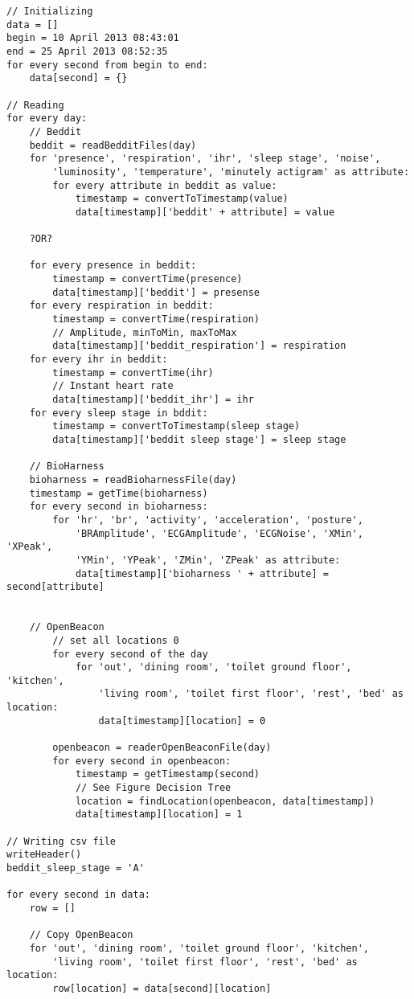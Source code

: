 \pagebreak

\lstset{
	language=Python,
	numbers=left,
	numberstyle=\tiny,
	frame=tb,
	basicstyle=\small,
	tabsize=2,
}
\begin{lstlisting}[caption=Pseudocode]
// Initializing
data = []
begin = 10 April 2013 08:43:01
end = 25 April 2013 08:52:35
for every second from begin to end:
	data[second] = {}

// Reading
for every day:
	// Beddit
	beddit = readBedditFiles(day)
	for 'presence', 'respiration', 'ihr', 'sleep stage', 'noise',
		'luminosity', 'temperature', 'minutely actigram' as attribute:
		for every attribute in beddit as value:
			timestamp = convertToTimestamp(value)
			data[timestamp]['beddit' + attribute] = value

	?OR?

	for every presence in beddit:
		timestamp = convertTime(presence)
		data[timestamp]['beddit'] = presense
	for every respiration in beddit:
		timestamp = convertTime(respiration)
		// Amplitude, minToMin, maxToMax
		data[timestamp]['beddit_respiration'] = respiration
	for every ihr in beddit:
		timestamp = convertTime(ihr)
		// Instant heart rate
		data[timestamp]['beddit_ihr'] = ihr
	for every sleep stage in bddit:
		timestamp = convertToTimestamp(sleep stage)
		data[timestamp]['beddit sleep stage'] = sleep stage

	// BioHarness
	bioharness = readBioharnessFile(day)
	timestamp = getTime(bioharness)
	for every second in bioharness:
		for 'hr', 'br', 'activity', 'acceleration', 'posture',
			'BRAmplitude', 'ECGAmplitude', 'ECGNoise', 'XMin', 'XPeak',
			'YMin', 'YPeak', 'ZMin', 'ZPeak' as attribute:
			data[timestamp]['bioharness ' + attribute] = second[attribute]


	// OpenBeacon
		// set all locations 0
		for every second of the day
			for 'out', 'dining room', 'toilet ground floor', 'kitchen',
				'living room', 'toilet first floor', 'rest', 'bed' as location:
				data[timestamp][location] = 0

		openbeacon = readerOpenBeaconFile(day)
		for every second in openbeacon:
			timestamp = getTimestamp(second)
			// See Figure Decision Tree
			location = findLocation(openbeacon, data[timestamp])
			data[timestamp][location] = 1

// Writing csv file
writeHeader()
beddit_sleep_stage = 'A'

for every second in data:
	row = []

	// Copy OpenBeacon
	for 'out', 'dining room', 'toilet ground floor', 'kitchen',
		'living room', 'toilet first floor', 'rest', 'bed' as location:
		row[location] = data[second][location]


\end{lstlisting}
